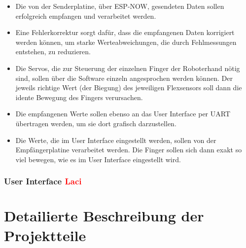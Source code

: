 \documentclass[11pt]{article}
\begin{document}
\begin{itemize}
	\item Die von der Senderplatine, über ESP-NOW, gesendeten Daten sollen erfolgreich empfangen und verarbeitet werden.
	\item Eine Fehlerkorrektur sorgt dafür, dass die empfangenen Daten korrigiert werden können, um starke Werteabweichungen, 
	die durch Fehlmessungen entstehen, zu reduzieren.
	\item Die Servos, die zur Steuerung der einzelnen Finger der Roboterhand nötig sind, sollen über die Software einzeln 
	angesprochen werden können. Der jeweils richtige Wert (der Biegung) des jeweiligen Flexsensors soll dann die idente 
	Bewegung des Fingers verursachen.
	\item Die empfangenen Werte sollen ebenso an das User Interface per UART übertragen werden, um sie dort grafisch 
	darzustellen.
	\item Die Werte, die im User Interface eingestellt werden, sollen von der Empfängerplatine verarbeitet werden. Die Finger 
	sollen sich dann exakt so viel bewegen, wie es im User Interface eingestellt wird.
		
\end{itemize}

\subsubsection{User Interface \textcolor{red}{Laci}}

\hfill \break
\hfill \break


\section{Detailierte Beschreibung der Projektteile}
\end{document}
